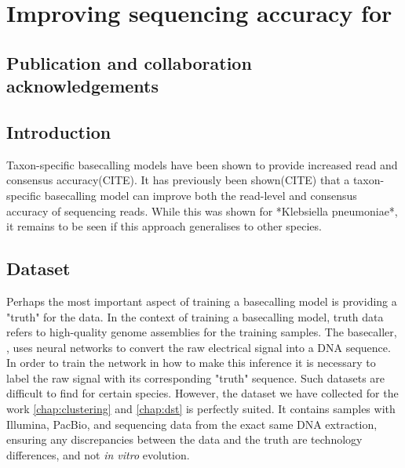 \chapter{Improving \ont{} sequencing accuracy for \mtb{}}
\label{chap:tubby}

\setcounter{section}{-1}
\section{Publication and collaboration acknowledgements}
\label{sec:ch4-acknowledge}

\section{Introduction}

Taxon-specific \ont{} basecalling models have been shown to provide increased read and consensus accuracy(CITE).
It has previously been shown(CITE) that a taxon-specific basecalling model can improve both the read-level and consensus accuracy of \ont{} sequencing reads. While this was shown for *Klebsiella pneumoniae*, it remains to be seen if this approach generalises to other species.

\section{Dataset}

 Perhaps the most important aspect of training a basecalling model is providing a "truth" for the data. In the context of training a \ont{} basecalling model, truth data refers to high-quality genome assemblies for the training samples. The \ont{} basecaller, \guppy{}, uses neural networks to convert the raw electrical signal into a DNA sequence. In order to train the network in how to make this inference it is necessary to label the raw signal with its corresponding "truth" sequence. Such datasets are difficult to find for certain species. However, the dataset we have collected for the work \autoref{chap:clustering} and \autoref{chap:dst} is perfectly suited. It contains samples with Illumina, PacBio, and \ont{} sequencing data from the exact same DNA extraction, ensuring any discrepancies between the \ont{} data and the truth are technology differences, and not \textit{in vitro} evolution. 

